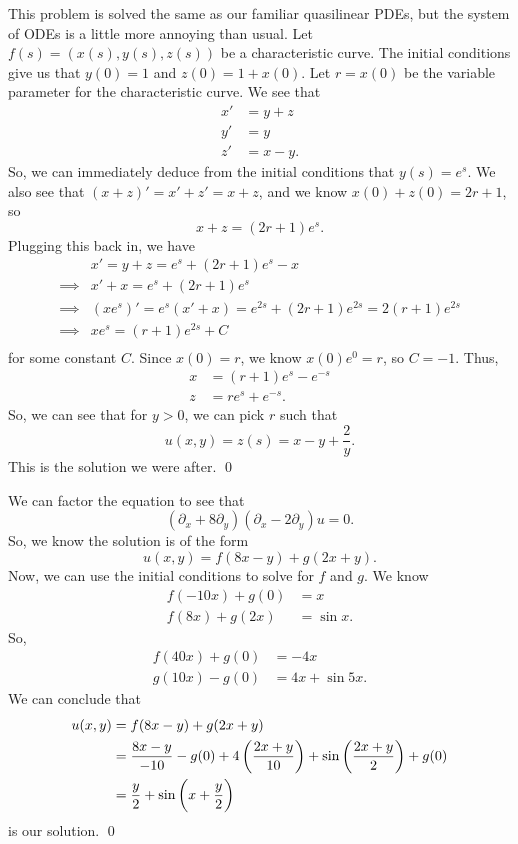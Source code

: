 \documentclass{article}
\renewcommand{\d}{\partial}
\begin{document}
\newpage
{}  \tri
\hop
\solution
This problem is solved the same as our familiar quasilinear PDEs, but the system of ODEs is a little more annoying than usual. Let $f(s) = (x(s), y(s),z(s))$ be a characteristic curve. The initial conditions give us that $y(0) = 1$ and $z(0) = 1 + x(0)$. Let $r = x(0)$ be the variable parameter for the characteristic curve. 
\hop 
We see that 
\begin{align*}
    x' &= y + z \\
    y' &= y\\
    z' &= x - y.
\end{align*}
So, we can immediately deduce from the initial conditions that $y(s) = e^s$. We also see that $(x+z)' = x'+z' = x+z$, and we know $x(0)+z(0) = 2r +1$, so \[x+z = (2r+1)e^s.\] 
Plugging this back in, we have 
\begin{align*}
    & x' = y+z = e^s+(2r+1)e^s - x \\ 
    \implies & x' + x = e^s + (2r+1)e^s \\
    \implies & (xe^{s})' = e^s(x' + x) = e^{2s} + (2r+1)e^{2s}= 2(r+1)e^{2s} \\
    \implies & xe^s = (r+1)e^{2s} + C\\
\end{align*}
for some constant $C$. Since $x(0) = r$, we know $x(0)e^0 = r$, so $C = -1$. Thus, 
\begin{align*}
    x &= (r+1)e^s - e^{-s}\\
    z &= re^s + e^{-s}.
\end{align*}
So, we can see that for $y > 0$, we can pick $r$ such that 
\[u(x,y) = z(s) = x - y + \frac{2}{y}.\]
This is the solution we were after. \qed


\newpage
{}  \tri
\hop
\solution
We can factor the equation to see that 
\[(\d_x+8\d_y)(\d_x-2\d_y)u = 0.\]
So, we know the solution is of the form 
\[u(x,y) = f(8x-y) + g(2x+y).\]
Now, we can use the initial conditions to solve for $f$ and $g$. We know 
\begin{align*}
    f(-10x)+g(0) &= x\\
    f(8x) + g(2x) &= \sin x.
\end{align*}
So, 
\begin{align*}
    f(40x) + g(0) &= -4x \\
    g(10x) - g(0) &= 4x + \sin 5x.
\end{align*}
We can conclude that 
\begin{align*}
    u(x,y) &= f(8x - y) + g(2x + y) \\
    &= \frac{8x-y}{-10} - g(0) + 4\del{\frac{2x+y}{10}} + \sin \del{\frac{2x+y}{2}} + g(0)\\
    &= \frac{y}{2} + \sin\del{x+ \frac{y}{2}}
\end{align*}
is our solution. \qed
\end{document}
